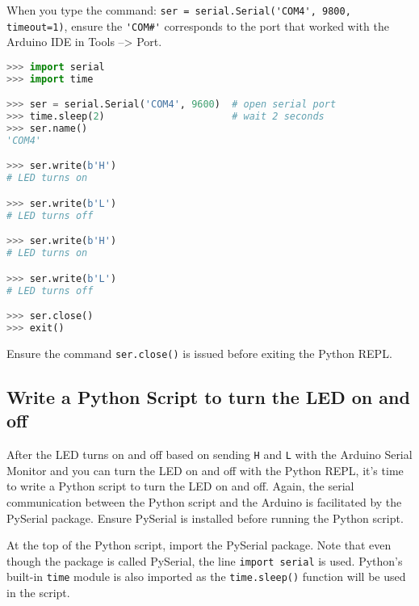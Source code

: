 \documentclass{book}
\newcommand{\passthrough}[1]{#1}
\begin{document}
When you type the command:
\passthrough{\lstinline!ser = serial.Serial('COM4', 9800, timeout=1)!},
ensure the \passthrough{\lstinline!'COM#'!} corresponds to the port that
worked with the Arduino IDE in Tools --\textgreater{} Port.

\begin{lstlisting}[language=Python]
>>> import serial
>>> import time

>>> ser = serial.Serial('COM4', 9600)  # open serial port
>>> time.sleep(2)                      # wait 2 seconds
>>> ser.name()
'COM4'

>>> ser.write(b'H')
# LED turns on

>>> ser.write(b'L')
# LED turns off

>>> ser.write(b'H')
# LED turns on

>>> ser.write(b'L')
# LED turns off

>>> ser.close()
>>> exit()
\end{lstlisting}

Ensure the command \passthrough{\lstinline!ser.close()!} is issued
before exiting the Python REPL.
    




    
        \hypertarget{write-a-python-script-to-turn-the-led-on-and-off}{%
\subsection{Write a Python Script to turn the LED on and
off}\label{write-a-python-script-to-turn-the-led-on-and-off}}
    




    
        After the LED turns on and off based on sending
\passthrough{\lstinline!H!} and \passthrough{\lstinline!L!} with the
Arduino Serial Monitor and you can turn the LED on and off with the
Python REPL, it's time to write a Python script to turn the LED on and
off. Again, the serial communication between the Python script and the
Arduino is facilitated by the PySerial package. Ensure PySerial is
installed before running the Python script.

At the top of the Python script, import the PySerial package. Note that
even though the package is called PySerial, the line
\passthrough{\lstinline!import serial!} is used. Python's built-in
\passthrough{\lstinline!time!} module is also imported as the
\passthrough{\lstinline!time.sleep()!} function will be used in the
script.
    
\end{document}
